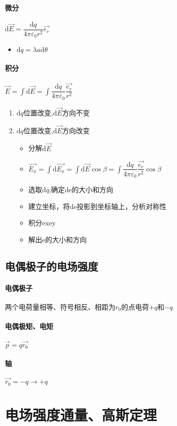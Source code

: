 \documentclass[UTF8,a4paper,12pt,scheme=chinese]{ctexbook}
\newcommand{\sll}[1]{\overrightarrow{#1}}
\newcommand{\ud}{\mathrm{d}}
\begin{document}
	\paragraph{微分}$ \ud \sll{E} = \dfrac{\ud q}{4\pi\varepsilon_0r^2}\sll{e_r} $
	\begin{itemize}
		\item $ \ud q =\lambda a \ud\theta$
	\end{itemize}
	\paragraph{积分}$ \sll{E} = \int\ud \sll{E} = \int \dfrac{\ud q}{4\pi\varepsilon_0}\dfrac{\sll{e_r}}{r^2} $
	\begin{enumerate}
		\item $ \ud q $位置改变,$ \ud \sll{E} $方向不变
		\item $ \ud q $位置改变,$ \ud \sll{E} $方向改变
		\begin{itemize}
			\item 分解$ \ud \sll{E} $
			\item $ \sll{E_x} = \int\ud \sll{E_x} = \int\ud \sll{E}\cos\beta = \int \dfrac{\ud q}{4\pi\varepsilon_0}\dfrac{\sll{e_r}}{r^2}\cos\beta $
			\item 选取$ \ud q $,确定de的大小和方向
			\item 建立坐标，将de投影到坐标轴上，分析对称性
			\item 积分exey
			\item 解出e的大小和方向
		\end{itemize}
	\end{enumerate}
	\subsection{电偶极子的电场强度}
	\paragraph{电偶极子}两个电荷量相等、符号相反、相距为$ r_0 $的点电荷$ +q $和$ -q $
	\paragraph{电偶极矩、电矩} $ \sll{p}=q\sll{r_0} $
	\paragraph{轴}$ \sll{r_0}= -q\rightarrow+q $
	\section{电场强度通量、高斯定理}
\end{document}
